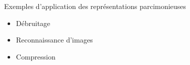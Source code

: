 \begin{frame}{Exemples d'application des représentations parcimonieuses}
\begin{itemize}
\item Débruitage
	\begin{figure}\centering
	\end{figure}
\item Reconnaissance d'images
\item Compression
\end{itemize}
\end{frame}


